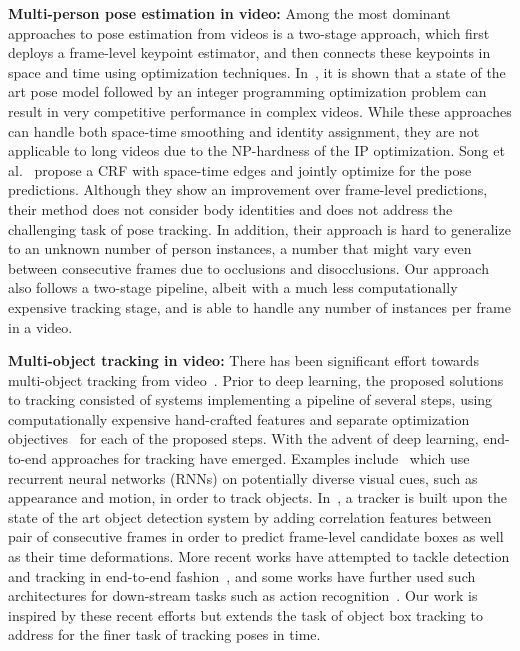 \documentclass[10pt,twocolumn,letterpaper]{article}
\begin{document}
{\noindent \bf Multi-person pose estimation in video:}
Among the most dominant approaches to pose estimation from videos is a two-stage approach, which first deploys a frame-level keypoint estimator, and then 
connects these keypoints in space and time using optimization techniques.
In~\cite{insafutdinov2016articulated,iqbal2016pose}, it is shown that a state of the art pose model followed by an integer programming optimization problem can result in very competitive performance in complex videos. While these approaches can handle both space-time smoothing and identity assignment, they are not applicable to long videos due to the NP-hardness of the IP optimization. Song et al.~\cite{song2017thin} propose a CRF with space-time edges and jointly optimize for the pose predictions. Although they show an improvement over frame-level predictions, their method does not consider body identities and does not address the challenging task of pose tracking. In addition, their approach is hard to generalize to an unknown number of person instances, a number that might vary even between consecutive frames due to occlusions and disocclusions. Our approach also follows a two-stage pipeline, albeit with a much less computationally expensive tracking stage, and is able to handle any number of instances per frame in a video.


{\noindent \bf Multi-object tracking in video:}
There has been significant effort towards multi-object tracking from video~\cite{Reid79,Fortman80}. Prior to deep learning, the proposed solutions to tracking consisted of systems implementing a pipeline of several steps, using computationally expensive hand-crafted features and separate optimization objectives~\cite{yu2016solution} for each of the proposed steps. With the advent of deep learning, end-to-end approaches for tracking have emerged. Examples include~\cite{sadeghian2017tracking,milan2017online} which use recurrent neural networks (RNNs) on potentially diverse visual cues, such as appearance and motion, in order to track objects. In~\cite{Feichtenhofer17DetectTrack}, a tracker is built upon the state of the art object detection system by adding correlation features between pair of consecutive frames in order to predict frame-level candidate boxes as well as their time deformations.
More recent works have attempted to tackle detection and tracking in end-to-end fashion~\cite{hou2017tcnn,kang2016tcnn,kang2016object}, and some works have further used such architectures for down-stream tasks such as action recognition~\cite{hou2017tcnn}.
Our work is inspired by these recent efforts but extends the task of object box tracking to address for the finer task of tracking poses in time.
\end{document}
